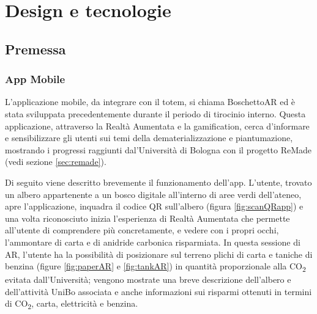 \chapter{Design e tecnologie}
\section{Premessa}
\subsection{App Mobile}
L'applicazione mobile, da integrare con il totem, si chiama BoschettoAR ed è stata sviluppata precedentemente durante il periodo di tirocinio interno. Questa applicazione, attraverso la Realtà Aumentata e la gamification, cerca d'informare e sensibilizzare gli utenti sui temi della dematerializzazione e piantumazione, mostrando i progressi raggiunti dal'Università di Bologna con il progetto ReMade (vedi sezione \ref{sec:remade}).

Di seguito viene descritto brevemente il funzionamento dell'app.
L'utente, trovato un albero appartenente a un bosco digitale all'interno di aree verdi dell'ateneo, apre l'applicazione, inquadra il codice QR sull'albero (figura \ref{fig:scanQRapp}) e una volta riconosciuto inizia l'esperienza di Realtà Aumentata che permette all'utente di comprendere più concretamente, e vedere con i propri occhi, l'ammontare di carta e di anidride carbonica risparmiata. In questa sessione di AR, l'utente ha la possibilità di posizionare sul terreno plichi di carta e taniche di benzina (figure \ref{fig:paperAR} e \ref{fig:tankAR}) in quantità proporzionale alla CO\textsubscript{2} evitata dall'Università; vengono mostrate una breve descrizione dell'albero e dell'attività UniBo associata e anche informazioni sui risparmi ottenuti in termini di CO\textsubscript{2}, carta, elettricità e benzina.


